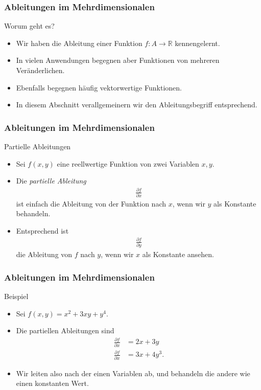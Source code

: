 \documentclass{beamer}
\title[Annuma]{\mytitle}
\author[Amin Coja-Oghlan]{Amin Coja-Oghlan}
\institute[Frankfurt]{JWGUFFM}
\date{}
\renewcommand{\emph}[1]{{\textcolor{solarizedRed}{\itshape #1}}}
\newcommand\RR{\mathbb R}
\renewcommand{\ae}{\"a}
\newcommand{\mytitle}{Ableitungen im Mehrdimensionalen}
\begin{document}
\frame[plain]{\titlepage}

\begin{frame}\frametitle{\mytitle}
	\begin{block}{Worum geht es?}
		\begin{itemize}
			\item Wir haben die Ableitung einer Funktion $f:A\to\RR$ kennengelernt.
			\item In vielen Anwendungen begegnen aber Funktionen von mehreren Ver\ae nderlichen.
			\item Ebenfalls begegnen h\ae ufig vektorwertige Funktionen.
			\item In diesem Abschnitt verallgemeinern wir den Ableitungsbegriff entsprechend.
		\end{itemize}
	\end{block}
\end{frame}

\begin{frame}\frametitle{\mytitle}
	\begin{block}{Partielle Ableitungen}
		\begin{itemize}
			\item Sei $f(x,y)$ eine reellwertige Funktion von zwei Variablen $x,y$.
			\item Die \emph{partielle Ableitung}
				\begin{align*}
				\frac{\partial f}{\partial x}
				\end{align*}
				ist einfach die Ableitung von der Funktion nach $x$, wenn wir $y$ \alert{als Konstante} behandeln.
			\item Entsprechend ist
				\begin{align*}
				\frac{\partial f}{\partial y}
				\end{align*}
				die Ableitung von $f$ nach $y$, wenn wir $x$ als Konstante ansehen.
		\end{itemize}
	\end{block}
\end{frame}

\begin{frame}\frametitle{\mytitle}
	\begin{block}{Beispiel}
		\begin{itemize}
			\item Sei $f(x,y)=x^2+3xy+y^4$.
			\item Die partiellen Ableitungen sind
\begin{align*}
	\frac{\partial f}{\partial x}&=2x+3y\\
	\frac{\partial f}{\partial x}&=3x+4y^3.
\end{align*}
			\item Wir leiten also nach der einen Variablen ab, und behandeln die andere wie einen konstanten Wert.
		\end{itemize}
	\end{block}
\end{frame}
\end{document}
